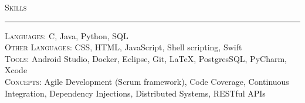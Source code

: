 \documentclass{res}
\begin{document}
\begin{resume}
\textsc{{\Large Skills}}
\vspace{0.5mm}
\hrule width18.5cm
	\textsc{Languages:} C, Java, Python, SQL\\[2mm]
	\textsc{Other Languages:} CSS, HTML, JavaScript, Shell scripting, Swift\\[2mm]
	\textsc{Tools:} Android Studio, Docker, Eclipse, Git, \LaTeX, PostgresSQL, PyCharm, Xcode\\[2mm]
	\textsc{Concepts:} Agile Development (Scrum framework), Code Coverage, Continuous Integration, Dependency Injections, Distributed Systems, RESTful APIs\\[0.5mm]
\vspace{-2mm}
\end{resume}
\end{document}
